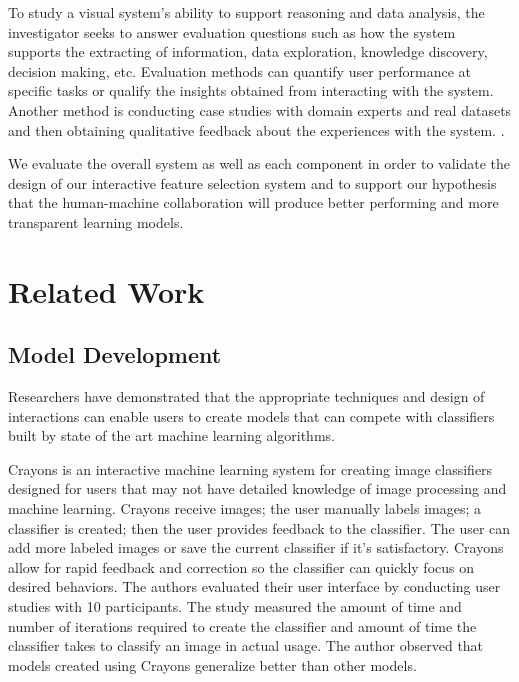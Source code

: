 To study a visual system's ability to support reasoning and data analysis, the investigator seeks to answer evaluation questions such as how the system supports the extracting of information, data exploration, knowledge discovery, decision making, etc. Evaluation methods can quantify user performance at specific tasks or qualify the insights obtained from interacting with the system. Another method is conducting case studies with domain experts and real datasets and then obtaining qualitative feedback about the experiences with the system. \cite{Evaluation}. 

We evaluate the overall system as well as each component in order to validate the design of our interactive feature selection system and to support our hypothesis that the human-machine collaboration will produce better performing and more transparent learning models.

\section{ Related Work }
\subsection { Model Development }
Researchers have demonstrated that the appropriate techniques and design of interactions can enable users to create models that can compete with classifiers built by state of the art machine learning algorithms. 

Crayons \cite{Crayon} is an interactive machine learning system for creating image classifiers designed for users that may not have detailed knowledge of image processing and machine learning. Crayons receive images; the user manually labels images; a classifier is created; then the user provides feedback to the classifier. The user can add more labeled images or save the current classifier if it's satisfactory. Crayons allow for rapid feedback and correction so the classifier can quickly focus on desired behaviors. The authors evaluated their user interface by conducting user studies with 10 participants. The study measured the amount of time and number of iterations required to create the classifier and amount of time the classifier takes to classify an image in actual usage. The author observed that models created using Crayons generalize better than other models. 

